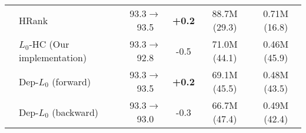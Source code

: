 \documentclass[runningheads, envcountsame, a4paper]{llncs}
\begin{document}
\begin{table}[ht]
\begin{tabular}{l l c c c c}
       & HRank~\cite{lin2020hrank} & 93.3$\rightarrow$93.5 &\textbf{+0.2} & 88.7M (29.3) & 0.71M (16.8) \\     
       \cline{2-6}
       & \cellcolor{blue!25}$L_0$-HC (Our implementation)  & \cellcolor{blue!25}93.3$\rightarrow$92.8 &\cellcolor{blue!25}-0.5& \cellcolor{blue!25}71.0M (44.1) & \cellcolor{blue!25}0.46M (45.9)     \\
       & \cellcolor{blue!25}Dep-$L_0$ (forward) & \cellcolor{blue!25}93.3$\rightarrow$93.5 & \cellcolor{blue!25}\textbf{+0.2} & \cellcolor{blue!25}69.1M (45.5) & \cellcolor{blue!25}0.48M (43.5)     \\
       & \cellcolor{blue!25}Dep-$L_0$ (backward) & \cellcolor{blue!25}93.3$\rightarrow$93.0 & \cellcolor{blue!25}-0.3 & \cellcolor{blue!25}66.7M (47.4) & \cellcolor{blue!25}0.49M (42.4)     \\
       \bottomrule
  \end{tabular}
  \label{tab:cifar10}
\end{table}
\end{document}

